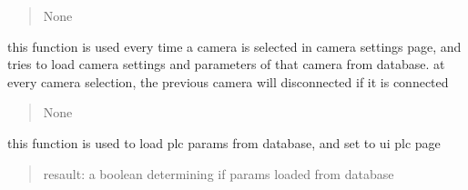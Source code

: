 \documentclass[letterpaper,10pt,english]{sphinxmanual}
\begin{document}
\begin{savenotes}
\begin{fulllineitems}
\begin{savenotes}
\begin{fulllineitems}
\begin{quote}
\begin{description}
\sphinxAtStartPar
None

\end{description}\end{quote}

\end{fulllineitems}\end{savenotes}


\begin{savenotes}\begin{fulllineitems}
\label{\detokenize{setting/setting_api:oxin.setting_api.API.load_camera_params_from_db_to_UI}}
\pysigstartsignatures
{}
\pysigstopsignatures
\sphinxAtStartPar
this function is used every time a camera is selected in camera settings page, and tries to load camera settings and
parameters of that camera from database.
at every camera selection, the previous camera will disconnected if it is connected
\begin{quote}\begin{description}
\sphinxAtStartPar
None

\end{description}\end{quote}

\end{fulllineitems}\end{savenotes}


\begin{savenotes}\begin{fulllineitems}
\label{\detokenize{setting/setting_api:oxin.setting_api.API.load_plc_parms}}
\pysigstartsignatures
{}
\pysigstopsignatures
\sphinxAtStartPar
this function is used to load plc params from database, and set to ui plc page
\begin{quote}\begin{description}
\sphinxAtStartPar
resault: a boolean determining if params loaded from database

\end{description}\end{quote}


\end{fulllineitems}
\end{savenotes}
\end{fulllineitems}
\end{savenotes}
\end{document}
